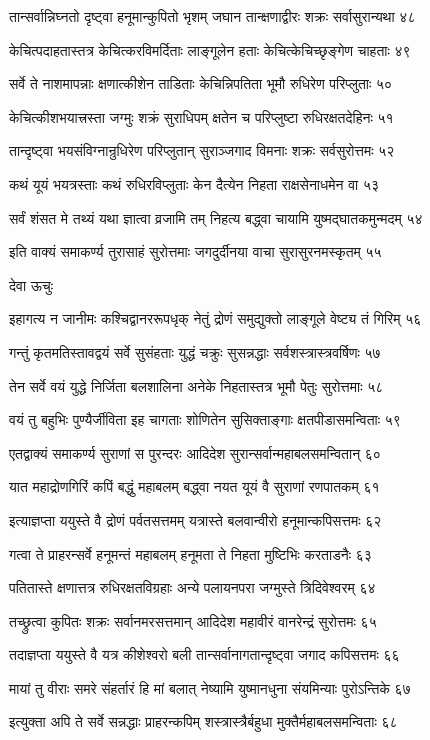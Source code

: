 तान्सर्वान्निघ्नतो दृष्ट्वा हनूमान्कुपितो भृशम्
जघान तान्क्षणाद्वीरः शक्रः सर्वासुरान्यथा ४८

केचित्पदाहतास्तत्र केचित्करविमर्दिताः
लाङ्गूलेन हताः केचित्केचिच्छृङ्गेण चाहताः ४९

सर्वे ते नाशमापन्नाः क्षणात्कीशेन ताडिताः
केचिन्निपतिता भूमौ रुधिरेण परिप्लुताः ५०

केचित्कीशभयात्त्रस्ता जग्मुः शक्रं सुराधिपम्
क्षतेन च परिप्लुष्टा रुधिरक्षतदेहिनः ५१

तान्दृष्ट्वा भयसंविग्नान्रुधिरेण परिप्लुतान्
सुराञ्जगाद विमनाः शक्रः सर्वसुरोत्तमः ५२

कथं यूयं भयत्रस्ताः कथं रुधिरविप्लुताः
केन दैत्येन निहता राक्षसेनाधमेन वा ५३

सर्वं शंसत मे तथ्यं यथा ज्ञात्वा व्रजामि तम्
निहत्य बद्ध्वा चायामि युष्मद्घातकमुन्मदम् ५४

इति वाक्यं समाकर्ण्य तुरासाहं सुरोत्तमाः
जगदुर्दीनया वाचा सुरासुरनमस्कृतम् ५५

देवा ऊचुः

इहागत्य न जानीमः कश्चिद्वानररूपधृक्
नेतुं द्रोणं समुद्युक्तो लाङ्गूले वेष्ट्य तं गिरिम् ५६

गन्तुं कृतमतिस्तावद्वयं सर्वे सुसंहताः
युद्धं चक्रुः सुसन्नद्धाः सर्वशस्त्रास्त्रवर्षिणः ५७

तेन सर्वे वयं युद्धे निर्जिता बलशालिना
अनेके निहतास्तत्र भूमौ पेतुः सुरोत्तमाः ५८

वयं तु बहुभिः पुण्यैर्जीविता इह चागताः
शोणितेन सुसिक्ताङ्गाः क्षतपीडासमन्विताः ५९

एतद्वाक्यं समाकर्ण्य सुराणां स पुरन्दरः
आदिदेश सुरान्सर्वान्महाबलसमन्वितान् ६०

यात महाद्रोणगिरिं कपिं बद्धुं महाबलम्
बद्ध्वा नयत यूयं वै सुराणां रणपातकम् ६१

इत्याज्ञप्ता ययुस्ते वै द्रोणं पर्वतसत्तमम्
यत्रास्ते बलवान्वीरो हनूमान्कपिसत्तमः ६२

गत्वा ते प्राहरन्सर्वे हनूमन्तं महाबलम्
हनूमता ते निहता मुष्टिभिः करताडनैः ६३

पतितास्ते क्षणात्तत्र रुधिरक्षतविग्रहाः
अन्ये पलायनपरा जग्मुस्ते त्रिदिवेश्वरम् ६४

तच्छ्रुत्वा कुपितः शक्रः सर्वानमरसत्तमान्
आदिदेश महावीरं वानरेन्द्रं सुरोत्तमः ६५

तदाज्ञप्ता ययुस्ते वै यत्र कीशेश्वरो बली
तान्सर्वानागतान्दृष्ट्वा जगाद कपिसत्तमः ६६

मायां तु वीराः समरे संहर्तारं हि मां बलात्
नेष्यामि युष्मानधुना संयमिन्याः पुरोऽन्तिके ६७

इत्युक्ता अपि ते सर्वे सन्नद्धाः प्राहरन्कपिम्
शस्त्रास्त्रैर्बहुधा मुक्तैर्महाबलसमन्विताः ६८

